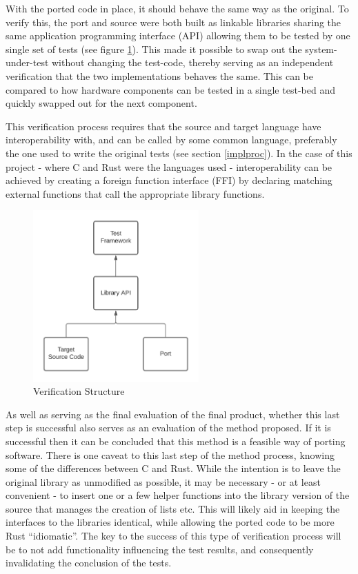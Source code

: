 With the ported code in place, it should behave the same way as the original. To verify this, the port and source were both built as linkable libraries sharing the same application programming interface (API) allowing them to be tested by one single set of tests (see figure \ref{fig:api}). This made it possible to swap out the system-under-test without changing the test-code, thereby serving as an independent verification that the two implementations behaves the same. This can be compared to how hardware components can be tested in a single test-bed and quickly swapped out for the next component.

This verification process requires that the source and target language have interoperability with, and can be called by some common language, preferably the one used to write the original tests (see section \ref{implproc}). In the case of this project - where C and Rust were the languages used - interoperability can be achieved by creating a foreign function interface (FFI) by declaring matching external functions that call the appropriate library functions. 

\begin{figure}[H]
\centerline{\includegraphics[width=2.5in]{api.png}}
\caption{Verification Structure}
\label{fig:api}
\end{figure}

As well as serving as the final evaluation of the final product, whether this last step is successful also serves as an evaluation of the method proposed. If it is successful then it can be concluded that this method is a feasible way of porting software. There is one caveat to this last step of the method process, knowing some of the differences between C and Rust. While the intention is to leave the original library as unmodified as possible, it may be necessary - or at least convenient - to insert one or a few helper functions into the library version of the source that manages the creation of lists etc. This will likely aid in keeping the interfaces to the libraries identical, while allowing the ported code to be more Rust “idiomatic”. The key to the success of this type of verification process will be to not add functionality influencing the test results, and consequently invalidating the conclusion of the tests.